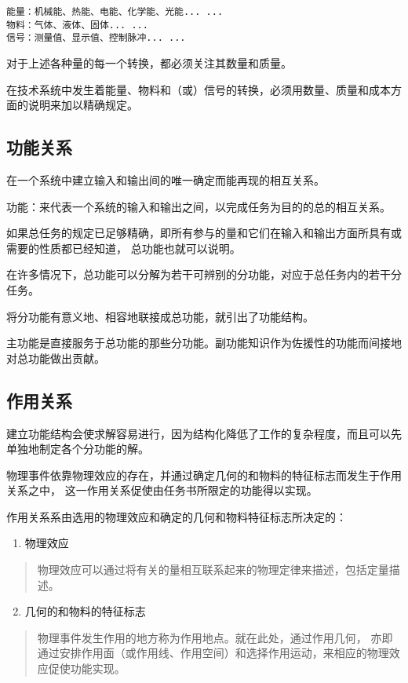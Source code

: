 \documentclass[letterpaper,10pt,english]{sphinxmanual}
\begin{document}
\begin{Verbatim}[commandchars=\\\{\}]
能量：机械能、热能、电能、化学能、光能... ...
物料：气体、液体、固体... ...
信号：测量值、显示值、控制脉冲... ...
\end{Verbatim}

对于上述各种量的每一个转换，都必须关注其数量和质量。

在技术系统中发生着能量、物料和（或）信号的转换，必须用数量、质量和成本方面的说明来加以精确规定。


\subsection{功能关系}
\label{unit2:id5}
在一个系统中建立输入和输出间的唯一确定而能再现的相互关系。

功能：来代表一个系统的输入和输出之间，以完成任务为目的的总的相互关系。

如果总任务的规定已足够精确，即所有参与的量和它们在输入和输出方面所具有或需要的性质都已经知道，
总功能也就可以说明。

在许多情况下，总功能可以分解为若干可辨别的分功能，对应于总任务内的若干分任务。

将分功能有意义地、相容地联接成总功能，就引出了功能结构。

主功能是直接服务于总功能的那些分功能。副功能知识作为佐援性的功能而间接地对总功能做出贡献。


\subsection{作用关系}
\label{unit2:id6}
建立功能结构会使求解容易进行，因为结构化降低了工作的复杂程度，而且可以先单独地制定各个分功能的解。

物理事件依靠物理效应的存在，并通过确定几何的和物料的特征标志而发生于作用关系之中，
这一作用关系促使由任务书所限定的功能得以实现。

作用关系系由选用的物理效应和确定的几何和物料特征标志所决定的：
\begin{enumerate}
\item {} 
物理效应

\end{enumerate}
\begin{quote}

物理效应可以通过将有关的量相互联系起来的物理定律来描述，包括定量描述。
\end{quote}
\begin{enumerate}
\setcounter{enumi}{1}
\item {} 
几何的和物料的特征标志

\end{enumerate}
\begin{quote}

物理事件发生作用的地方称为作用地点。就在此处，通过作用几何，
亦即通过安排作用面（或作用线、作用空间）和选择作用运动，来相应的物理效应促使功能实现。
\end{quote}
\end{document}
